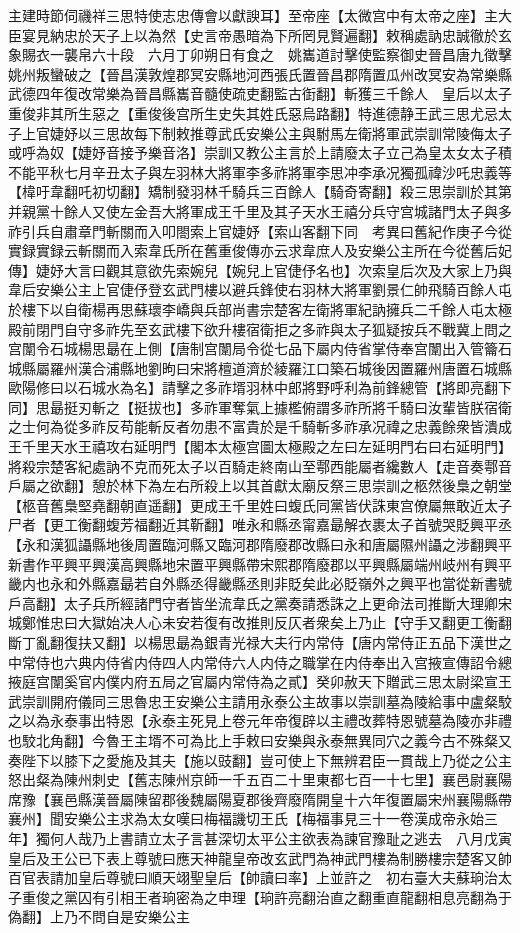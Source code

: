 主建時節伺禨祥三思特使志忠傳會以獻諛耳】至帝座【太微宫中有太帝之座】主大臣宴見納忠於天子上以為然【史言帝愚暗為下所罔見賢遍翻】敕稱處訥忠誠徹於玄象賜衣一襲帛六十段　六月丁卯朔日有食之　姚巂道討擊使監察御史晉昌唐九徵擊姚州叛蠻破之【晉昌漢敦煌郡冥安縣地河西張氏置晉昌郡隋置瓜州改冥安為常樂縣武德四年復改常樂為晉昌縣巂音髓使疏吏翻監古衘翻】斬獲三千餘人　皇后以太子重俊非其所生惡之【重俊後宫所生史失其姓氏惡烏路翻】特進德静王武三思尤忌太子上官婕妤以三思故每下制敕推尊武氏安樂公主與駙馬左衛將軍武崇訓常陵侮太子或呼為奴【婕妤音接予樂音洛】崇訓又教公主言於上請廢太子立己為皇太女太子積不能平秋七月辛丑太子與左羽林大將軍李多祚將軍李思冲李承况獨孤禕沙吒忠義等【椲吁韋翻吒初切翻】矯制發羽林千騎兵三百餘人【騎奇寄翻】殺三思崇訓於其第并親黨十餘人又使左金吾大將軍成王千里及其子天水王禧分兵守宫城諸門太子與多祚引兵自肅章門斬關而入叩閤索上官婕妤【索山客翻下同　考異曰舊紀作庚子今從實録實録云斬關而入索韋氏所在舊重俊傳亦云求韋庶人及安樂公主所在今從舊后妃傳】婕妤大言曰觀其意欲先索婉兒【婉兒上官倢伃名也】次索皇后次及大家上乃與韋后安樂公主上官倢伃登玄武門樓以避兵鋒使右羽林大將軍劉景仁帥飛騎百餘人屯於樓下以自衛楊再思蘇瓌李嶠與兵部尚書宗楚客左衛將軍紀訥擁兵二千餘人屯太極殿前閉門自守多祚先至玄武樓下欲升樓宿衛拒之多祚與太子狐疑按兵不戰冀上問之宫闈令石城楊思朂在上側【唐制宫闈局令從七品下屬内侍省掌侍奉宫闈出入管籥石城縣屬羅州漢合浦縣地劉昫曰宋將檀道濟於綾羅江口築石城後因置羅州唐置石城縣歐陽修曰以石城水為名】請擊之多祚壻羽林中郎將野呼利為前鋒總管【將即亮翻下同】思朂挺刃斬之【挺拔也】多祚軍奪氣上據檻俯謂多祚所將千騎曰汝輩皆朕宿衛之士何為從多祚反苟能斬反者勿患不富貴於是千騎斬多祚承况禕之忠義餘衆皆潰成王千里天水王禧攻右延明門【閣本太極宫圖太極殿之左曰左延明門右曰右延明門】將殺宗楚客紀處訥不克而死太子以百騎走終南山至鄠西能屬者纔數人【走音奏鄠音戶屬之欲翻】憩於林下為左右所殺上以其首獻太廟反祭三思崇訓之柩然後梟之朝堂【柩音舊梟堅堯翻朝直遥翻】更成王千里姓曰蝮氏同黨皆伏誅東宫僚屬無敢近太子尸者【更工衡翻蝮芳福翻近其靳翻】唯永和縣丞甯嘉朂解衣裹太子首號哭貶興平丞【永和漢狐讘縣地後周置臨河縣又臨河郡隋廢郡改縣曰永和唐屬隰州讘之涉翻興平新書作平興平興漢高興縣地宋置平興縣帶宋熙郡隋廢郡以平興縣屬端州岐州有興平畿内也永和外縣嘉朂若自外縣丞得畿縣丞則非貶矣此必貶嶺外之興平也當從新書號戶高翻】太子兵所經諸門守者皆坐流韋氏之黨奏請悉誅之上更命法司推斷大理卿宋城鄭惟忠曰大獄始决人心未安若復有改推則反仄者衆矣上乃止【守手又翻更工衡翻斷丁亂翻復扶又翻】以楊思朂為銀青光禄大夫行内常侍【唐内常侍正五品下漢世之中常侍也六典内侍省内侍四人内常侍六人内侍之職掌在内侍奉出入宫掖宣傳詔令總掖庭宫闈奚官内僕内府五局之官屬内常侍為之貳】癸卯赦天下贈武三思太尉梁宣王武崇訓開府儀同三思魯忠王安樂公主請用永泰公主故事以崇訓墓為陵給事中盧粲駮之以為永泰事出特恩【永泰主死見上卷元年帝復辟以主禮改葬特恩號墓為陵亦非禮也駮北角翻】今魯王主壻不可為比上手敕曰安樂與永泰無異同穴之義今古不殊粲又奏陛下以膝下之愛施及其夫【施以豉翻】豈可使上下無辨君臣一貫哉上乃從之公主怒出粲為陳州刺史【舊志陳州京師一千五百二十里東都七百一十七里】襄邑尉襄陽席豫【襄邑縣漢晉屬陳留郡後魏屬陽夏郡後齊廢隋開皇十六年復置屬宋州襄陽縣帶襄州】聞安樂公主求為太女嘆曰梅福譏切王氏【梅福事見三十一卷漢成帝永始三年】獨何人哉乃上書請立太子言甚深切太平公主欲表為諫官豫耻之逃去　八月戊寅皇后及王公已下表上尊號曰應天神龍皇帝改玄武門為神武門樓為制勝樓宗楚客又帥百官表請加皇后尊號曰順天翊聖皇后【帥讀曰率】上並許之　初右臺大夫蘇珦治太子重俊之黨囚有引相王者珦密為之申理【珦許亮翻治直之翻重直龍翻相息亮翻為于偽翻】上乃不問自是安樂公主